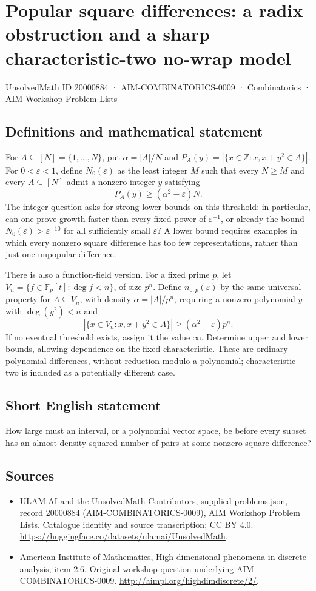 \documentclass[11pt,a4paper]{article}
\begin{document}
\section*{Popular square differences: a radix obstruction and a sharp characteristic-two no-wrap model}\label{20000884}
{\small UnsolvedMath ID 20000884 · AIM-COMBINATORICS-0009 · Combinatorics · AIM Workshop Problem Lists}
\subsection{Definitions and mathematical statement}
For $A\subseteq[N]=\{1,\ldots,N\}$, put $\alpha=|A|/N$ and
$P_A(y)=|\{x\in\mathbb Z:x,x+y^2\in A\}|$.
For $0<\varepsilon<1$, define $N_0(\varepsilon)$ as the least integer $M$ such that every $N\geq M$ and every $A\subseteq[N]$ admit a nonzero integer $y$ satisfying
\[
 P_A(y)\geq(\alpha^2-\varepsilon)N.
\]
The integer question asks for strong lower bounds on this threshold: in particular, can one prove growth faster than every fixed power of $\varepsilon^{-1}$, or already the bound $N_0(\varepsilon)>\varepsilon^{-10}$ for all sufficiently small $\varepsilon$?
A lower bound requires examples in which every nonzero square difference has too few representations, rather than just one unpopular difference.

There is also a function-field version.
For a fixed prime $p$, let $V_n=\{f\in\mathbb F_p[t]:\deg f<n\}$, of size $p^n$.
Define $n_{0,p}(\varepsilon)$ by the same universal property for $A\subseteq V_n$, with density $\alpha=|A|/p^n$, requiring a nonzero polynomial $y$ with $\deg(y^2)<n$ and
\[
 |\{x\in V_n:x,x+y^2\in A\}|\geq(\alpha^2-\varepsilon)p^n.
\]
If no eventual threshold exists, assign it the value $\infty$.
Determine upper and lower bounds, allowing dependence on the fixed characteristic.
These are ordinary polynomial differences, without reduction modulo a polynomial; characteristic two is included as a potentially different case.
\subsection{Short English statement}
How large must an interval, or a polynomial vector space, be before every subset has an almost density-squared number of pairs at some nonzero square difference?
\subsection{Sources}
\begin{itemize}
\item[S1] ULAM.AI and the UnsolvedMath Contributors, supplied problems.json, record 20000884 (AIM-COMBINATORICS-0009), AIM Workshop Problem Lists. Catalogue identity and source transcription; CC BY 4.0.
\url{https://huggingface.co/datasets/ulamai/UnsolvedMath}.
\item[S2] American Institute of Mathematics, High-dimensional phenomena in discrete analysis, item 2.6. Original workshop question underlying AIM-COMBINATORICS-0009.
\url{http://aimpl.org/highdimdiscrete/2/}.
\end{itemize}
\end{document}
